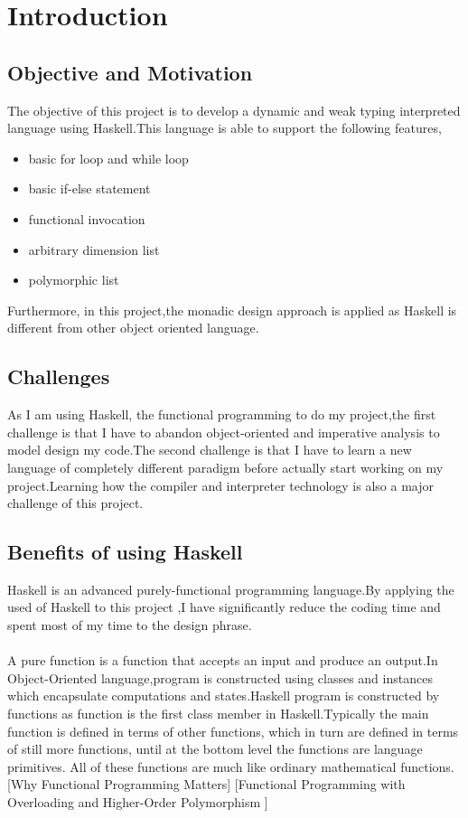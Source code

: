 \chapter{Introduction}
\section{Objective and Motivation}
The objective of this project is to develop a dynamic and weak typing interpreted language using Haskell.This language is able to support the following features,
\begin{itemize}
\item basic for loop and while loop
\item basic if-else statement
\item functional invocation 
\item arbitrary dimension list
\item polymorphic list
\end{itemize}

Furthermore, in this project,the monadic design approach is applied as Haskell is different from other object oriented language.


\section{Challenges}
As I am using Haskell, the functional programming to do my project,the first challenge is that I have to abandon object-oriented and imperative analysis to model design my code.The second challenge is that I have to learn a new language of completely different paradigm before actually start working on my project.Learning how the compiler and interpreter technology is also a major challenge of this project.

\section{Benefits of using Haskell} 
Haskell is an advanced purely-functional programming language.By applying the used of Haskell to this project ,I have significantly reduce the coding time and spent most of my time to the design phrase.
\\
\\
A pure function is a function that accepts an input and produce an output.In Object-Oriented language,program is constructed using classes and instances which encapsulate computations and states.Haskell program is constructed by functions as function is the first class member in Haskell.Typically the main function is defined in terms of other functions, which in turn are defined in terms of still more functions, until at the bottom level the functions are language primitives. All of these functions are much like ordinary mathematical functions.
[Why Functional Programming Matters]
[Functional Programming with Overloading and
Higher-Order Polymorphism
]
